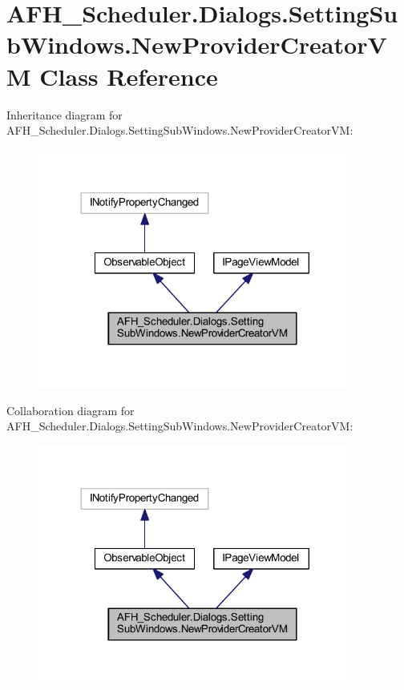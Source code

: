 \section{A\+F\+H\+\_\+\+Scheduler.\+Dialogs.\+Setting\+Sub\+Windows.\+New\+Provider\+Creator\+VM Class Reference}
\label{class_a_f_h___scheduler_1_1_dialogs_1_1_setting_sub_windows_1_1_new_provider_creator_v_m}


Inheritance diagram for A\+F\+H\+\_\+\+Scheduler.\+Dialogs.\+Setting\+Sub\+Windows.\+New\+Provider\+Creator\+VM\+:
\nopagebreak
\begin{figure}[H]
\begin{center}
\leavevmode
\includegraphics[width=293pt]{class_a_f_h___scheduler_1_1_dialogs_1_1_setting_sub_windows_1_1_new_provider_creator_v_m__inherit__graph}
\end{center}
\end{figure}


Collaboration diagram for A\+F\+H\+\_\+\+Scheduler.\+Dialogs.\+Setting\+Sub\+Windows.\+New\+Provider\+Creator\+VM\+:
\nopagebreak
\begin{figure}[H]
\begin{center}
\leavevmode
\includegraphics[width=293pt]{class_a_f_h___scheduler_1_1_dialogs_1_1_setting_sub_windows_1_1_new_provider_creator_v_m__coll__graph}
\end{center}
\end{figure}

